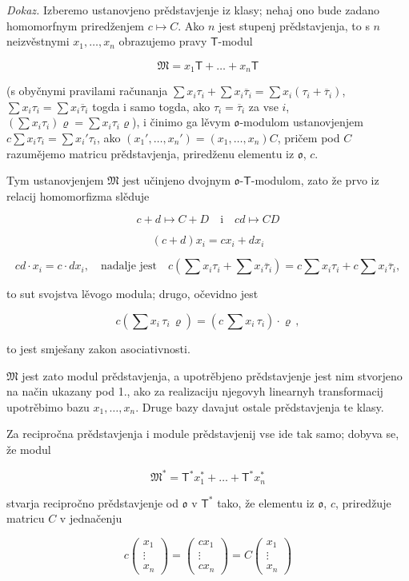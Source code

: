 \documentclass[11pt]{article}
\begin{document}
\emph{Dokaz.} Izberemo ustanovjeno prědstavjenje iz klasy; nehaj ono bude zadano homomorfnym priredženjem \(c\mapsto C\). Ako \(n\) jest stupenj prědstavjenja, to s \(n\) neizvěstnymi \(x_1,\ldots,x_n\) obrazujemo pravy \(\mathsf T\)-modul

\[\mathfrak{M} = x_1 \mathsf{T} + \dots + x_n \mathsf{T}\]

(s obyčnymi pravilami računanja \(\sum x_i\tau_i+\sum x_i\overline{\tau}_i=\sum x_i(\tau_i+\overline{\tau}_i)\), \(\sum x_i\tau_i=\sum x_i\overline{\tau}_i\) togda i samo togda, ako \(\tau_i=\overline{\tau}_i\) za vse \(i\), \((\sum x_i\tau_i)\varrho=\sum x_i\tau_i\varrho\)), i činimo ga lěvym \(\mathfrak{o}\)-modulom ustanovjenjem \(c\sum x_i\tau_i=\sum x_i'\tau_i\), ako \((x_1',\ldots,x_n')=(x_1,\ldots,x_n)C\), pričem pod \(C\) razumějemo matricu prědstavjenja, priredženu elementu iz \(\mathfrak{o}\), \(c\).

Tym ustanovjenjem \(\mathfrak M\) jest učinjeno dvojnym \(\mathfrak{o}\)-\(\mathsf T\)-modulom, zato že prvo iz relacij homomorfizma slěduje

\[
c+d\mapsto C+D \quad \text{i} \quad cd\mapsto CD
\]

\[
(c+d)x_i=cx_i+dx_i
\]

\[
cd\cdot x_i=c\cdot dx_i,\quad\text{nadalje jest}\quad
c\left(\sum x_i\tau_i+\sum x_i\overline{\tau}_i\right)
=c\sum x_i\tau_i+c\sum x_i\overline{\tau}_i,
\]

to sut svojstva lěvogo modula; drugo, očevidno jest

\[c(\sum x_i \, \tau_i \, \varrho) = (c \, \sum x_i \, \tau_i) \cdot \varrho \,,\]

to jest smješany zakon asociativnosti.

\(\mathfrak{M}\) jest zato modul prědstavjenja, a upotrěbjeno prědstavjenje jest nim stvorjeno na način ukazany pod 1., ako za realizaciju njegovyh linearnyh transformacij upotrěbimo bazu \(x_1, \ldots, x_n\). Druge bazy davajut ostale prědstavjenja te klasy.

Za recipročna prědstavjenja i module prědstavjenij vse ide tak samo; dobyva se, že modul

\[\mathfrak{M}^* = \mathsf{T}^* x_1^* + \dots + \mathsf{T}^* x_n^*\]

stvarja recipročno prědstavjenje od \(\mathfrak{o}\) v \(\mathsf T^*\) tako, že elementu iz \(\mathfrak{o}\), \(c\), priredžuje matricu \(C\) v jednačenju

\[
c\begin{pmatrix}x_1\\ \vdots\\ x_n\end{pmatrix}
=\begin{pmatrix}cx_1\\ \vdots\\ cx_n\end{pmatrix}
=C\begin{pmatrix}x_1\\ \vdots\\ x_n\end{pmatrix}
\]
\end{document}
